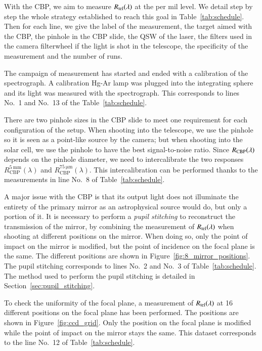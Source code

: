 With the CBP, we aim to measure $R_{\mathrm{tel}}(\lambda)$ at the per mil level. We detail step by step the whole strategy established to reach this goal in Table~\ref{tab:schedule}. Then for each line, we give the label of the measurement, the target aimed with the CBP, the pinhole in the CBP slide, the QSW of the laser, the filters used in the \SD camera filterwheel if the light is shot in the telescope, the specificity of the measurement and the number of runs.

The campaign of measurement has started and ended with a calibration of the spectrograph. A calibration Hg-Ar lamp was plugged into the integrating sphere and its light was measured with the spectrograph. This corresponds to lines No.~1 and No.~13 of the Table~\ref{tab:schedule}.

There are two pinhole sizes in the CBP slide to meet one requirement for each configuration of the setup. When shooting into the \SD telescope, we use the \spinhole pinhole so it is seen as a point-like source by the \SD camera; but when shooting into the solar cell, we use the \bpinhole pinhole to have the best signal-to-noise ratio. Since $R_{\mathrm{CBP}}(\lambda)$ depends on the pinhole diameter, we need to intercalibrate the two responses $R_\mathrm{CBP}^{\mathrm{\SI{5}{\milli\meter}}} (\lambda)$ and $R_\mathrm{CBP}^{\mathrm{\SI{75}{\micro\meter}}} (\lambda)$. This intercalibration can be performed thanks to the measurements in line No.~8 of Table~\ref{tab:schedule}.

A major issue with the CBP is that its output light does not illuminate the entirety of the \SD primary mirror as an astrophysical source would do, but only a portion of it. It is necessary to perform a \textit{pupil stitching} to reconstruct the transmission of the mirror, by combining the measurement of $R_{\mathrm{tel}}(\lambda)$ when shooting at different positions on the mirror. When doing so, only the point of impact on the mirror is modified, but the point of incidence on the focal plane is the same. The different positions are shown in Figure~\ref{fig:8_mirror_positions}. The pupil stitching corresponds to lines No.~2 and No.~3 of Table~\ref{tab:schedule}. The method used to perform the pupil stitching is detailed in Section~\ref{sec:pupil_stitching}.

To check the uniformity of the \SD focal plane, a measurement of $R_{\mathrm{tel}}(\lambda)$ at 16 different positions on the focal plane has been performed. The positions are shown in Figure~\ref{fig:ccd_grid}. Only the position on the focal plane is modified while the point of impact on the mirror stays the same. This dataset corresponds to the line No.~12 of Table~\ref{tab:schedule}. 

